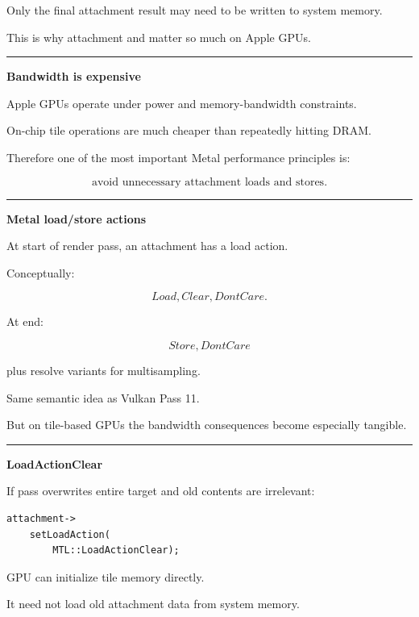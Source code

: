 Only the final attachment result may need to be written to system memory.

This is why attachment  and  matter so much on Apple GPUs.

\begin{center}\rule{0.5\linewidth}{0.5pt}\end{center}

\textbf{Bandwidth is expensive}

Apple GPUs operate under power and memory-bandwidth constraints.

On-chip tile operations are much cheaper than repeatedly hitting DRAM.

Therefore one of the most important Metal performance principles is:

\[
\boxed{
\text{avoid unnecessary attachment loads and stores}.
}
\]

\begin{center}\rule{0.5\linewidth}{0.5pt}\end{center}

\textbf{Metal load/store actions}

At start of render pass, an attachment has a load action.

Conceptually:

\[
Load,
Clear,
DontCare.
\]

At end:

\[
Store,
DontCare
\]

plus resolve variants for multisampling.

Same semantic idea as Vulkan Pass 11.

But on tile-based GPUs the bandwidth consequences become especially tangible.

\begin{center}\rule{0.5\linewidth}{0.5pt}\end{center}

\textbf{LoadActionClear}

If pass overwrites entire target and old contents are irrelevant:

\begin{verbatim}
attachment->
    setLoadAction(
        MTL::LoadActionClear);
\end{verbatim}

GPU can initialize tile memory directly.

It need not load old attachment data from system memory.

